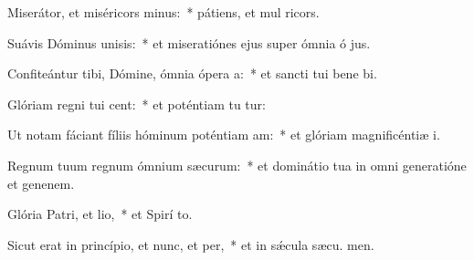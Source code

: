 \item Miserátor, et miséricors minus:~* pátiens, et mul ricors.
\item Suávis Dóminus unisis:~* et miseratiónes ejus super ómnia ó jus.
\item Confiteántur tibi, Dómine, ómnia ópera a:~* et sancti tui bene bi.
\item Glóriam regni tui cent:~* et poténtiam tu tur:
\item Ut notam fáciant fíliis hóminum poténtiam am:~* et glóriam magnificéntiæ  i.
\item Regnum tuum regnum ómnium sæcurum:~* et dominátio tua in omni generatióne et genenem.
\item Glória Patri, et lio,~* et Spirí to.
\item Sicut erat in princípio, et nunc, et per,~* et in sǽcula sæcu. men.
